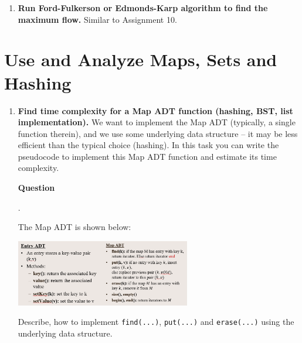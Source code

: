 \documentclass[a4paper,12pt]{article}
\newcounter{mcounter}
\newcommand\showmcounter{\addtocounter{mcounter}{1}\themcounter}
\begin{document}
{\begin{enumerate}[label=2.\Alph*.]
\vspace{10pt}
{\bf Question \showmcounter.} 
Given a graph $G(V,E)$ with $n$ vertices and $m$ edges, the complexity of the Prim's algorithm is 
$O(m \log n)$ (you need to loop over all $m$ edges; and 
one operation of manipulating the priority queue costs $O(\log n)$). 

Describe a variant of Prim's algorithm that runs on the matrix representation of the graph in $O(n^2)$ time. 



\item {\bf Run Ford-Fulkerson or Edmonds-Karp algorithm to find the maximum flow.}
Similar to Assignment 10. 
\end{enumerate}











\section{Use and Analyze Maps, Sets and Hashing}
\setcounter{mcounter}{0}

\begin{enumerate}[label=3.\Alph*.]
\item {\bf Find time complexity for a Map ADT function (hashing, BST, list implementation).} 
We want to implement the Map ADT (typically, a single function therein), 
and we use some underlying data structure -- it may be less efficient than the typical choice (hashing). 
In this task you can write the pseudocode to implement this Map ADT function and estimate 
its time complexity. 


\vspace{10pt}
{\bf Question \showmcounter.}

The Map ADT is shown below: 

\begin{center}
\includegraphics[width=3in]{ds-exam3/map-adt.png}
\end{center}

Describe, how to implement {\tt find(...)}, {\tt put(...)} and {\tt erase(...)}
using the underlying data structure. 


\end{enumerate}}
\end{document}
